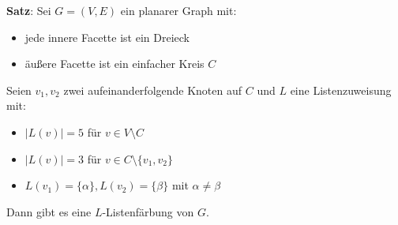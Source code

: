\textbf{Satz}: Sei $G=(V,E)$ ein planarer Graph mit:
\begin{itemize}
	\item jede innere Facette ist ein Dreieck
	\item äußere Facette ist ein einfacher Kreis $C$
\end{itemize}
Seien $v_1,v_2$ zwei aufeinanderfolgende Knoten auf $C$ und $L$ eine Listenzuweisung mit:
\begin{itemize}
	\item $|L(v)|=5$ für $v\in V\setminus C$
	\item $|L(v)|=3$ für $v\in C\setminus \{v_1,v_2\}$
	\item $L(v_1)=\{\alpha\}, L(v_2)=\{\beta\}$ mit $\alpha\neq\beta$
\end{itemize}
Dann gibt es eine $L$-Listenfärbung von $G$.

